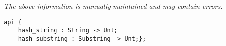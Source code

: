 \label{pkg:hash\_string}

{\tiny \it The above information is manually maintained and may contain errors.}
\begin{verbatim}
api {
    hash_string : String -> Unt;
    hash_substring : Substring -> Unt;};
\end{verbatim}
